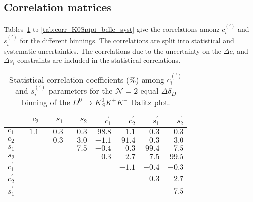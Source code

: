 \documentclass[aps,prd,superscriptaddress,nopreprintnumbers,nofootinbib,showpacs,floatfix]{revtex4}
\begin{document}
\subsection{Correlation matrices}
Tables~\ref{tab:corr_K0SKK_2bin_stat} to \ref{tab:corr_K0Spipi_belle_syst} give the correlations among %
$c^{(\prime)}_{i}$ and $s^{(\prime)}_{i}$ for the different binnings. The correlations are split into statistical %
and systematic uncertainties. The correlations due to the uncertainty on the $\Delta c_i$ and $\Delta s_i$ %
constraints are included in the statistical correlations. 

\begin{table}[htb]
\caption{Statistical correlation coefficients (\%) among $c^{(\prime)}_{i}$ and $s^{(\prime)}_{i}$ parameters for %
the $\mathcal{N}=2$ equal $\Delta\delta_D$ binning of the $D^{0}\to K^{0}_{S}K^{+}K^{-}$ Dalitz %
plot.}\label{tab:corr_K0SKK_2bin_stat}
\begin{center} 
\begin{tabular}{lrrrrrrr} \hline\hline
               & $c_2 $ & $s_1$ & $s_2$ & $c^{\prime}_1$ & $c^{\prime}_2$ & $s^{\prime}_1$ & $s^{\prime}_2$ \\ %
\hline 
$c_1$          & $ -1.1 $   & $ -0.3 $   & $ -0.3 $   & $  98.8 $  & $ -1.1 $   & $ -0.3 $   & $ -0.3 $ \\ 
$c_2$          &            & $  0.3 $   & $  3.0 $   & $ -1.1 $   & $  91.4 $  & $  0.3 $   & $  3.0 $ \\ 
$s_1$          &            &            & $  7.5 $   & $ -0.4 $   & $  0.3 $   & $  99.4 $  & $  7.5 $ \\ 
$s_2$          &            &            &            & $ -0.3 $   & $  2.7 $   & $  7.5 $   & $  99.5 $ \\
$c^{\prime}_1$ &            &            &            &            & $ -1.1 $   & $ -0.4 $   & $ -0.3 $ \\ 
$c^{\prime}_2$ &            &            &            &            &            & $  0.3 $   & $  2.7 $ \\ 
$s^{\prime}_1$ &            &            &            &            &            &            & $  7.5 $ \\ 
\hline\hline
\end{tabular}
\end{center}
\end{table}
\end{document}
